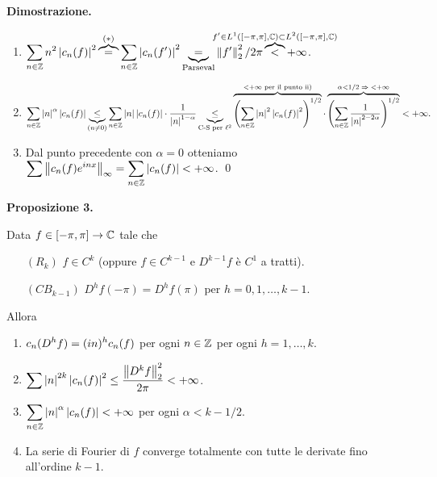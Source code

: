 \textbf{Dimostrazione.}
\begin{enumerate}

	\item $\ds \sum_{n \in \Z} n^2 \left| c_n(f) \right|^2 \overbrace{=}^{(\ast)} \sum_{n \in \Z} \left| c_n(f') \right|^2
	\underbrace{=}_{\text{Parseval}} \norm{f'}_2^2 / 2\pi \overbrace{<}^{\mathclap{f' \in L^1([-\pi,\pi], \C) \subset L^2([-\pi,\pi], \C) }} +\infty$.

	\item $\displaystyle \sum_{n \in \mathbb Z} \left| n \right|^\alpha \left| c_n(f) \right| 
	\underbrace{\leq}_{(n \neq 0)} \sum_{n \in \mathbb Z} \left| n \right| \left| c_n(f) \right| \cdot \frac{1}{\left| n \right|^{1-\alpha }}
	\underbrace{\leq}_{\text{C-S per } \ell^2} \overbrace{\left( \sum_{n \in \mathbb Z} \left| n \right|^2 \left| c_n(f) \right|^2  \right)^{1/2}}^{< +\infty \text{ per il punto ii)}} \cdot \overbrace{\left( \sum_{n \in \mathbb Z} \frac{1}{\left| n \right|^{2-2\alpha }}  \right)^{1/2}}^{\alpha < 1/2 \; \Rightarrow \; <+\infty} < +\infty. 
	$

	\item Dal punto precedente con $\alpha = 0$ otteniamo $\displaystyle \sum \left\lVert c_n(f) e^{inx} \right\rVert_\infty = \sum_{n \in \mathbb Z} \left| c_n(f) \right| < +\infty $.
\qed
\end{enumerate}

\newpage

\hypertarget{prop:2021-08nov_prop_3}{%
\textbf{Proposizione 3.}} Data $f \in [-\pi,\pi] \to \mathbb C$ tale che
\begin{itemize}
	\item[$(R_k)$] $f \in C^k$ (oppure $f \in C^{k-1}$ e $D^{k-1}f$ è $C^1$ a tratti).

	\item[$(CB_{k-1})$] $D^h f(-\pi) = D^h f(\pi)$ per $h = 0,1,\ldots, k-1$.
\end{itemize}
Allora
\begin{enumerate}
	\item $\displaystyle c_n (D^h f) = (in)^h c_n(f)$ per ogni $n \in \mathbb Z$ per ogni $h = 1,\ldots,k$.

	\item $\displaystyle \sum \left| n \right|^{2k} \left| c_n(f) \right|^2 \leq \frac{\left\lVert D^k f \right\rVert_2^2}{2\pi} < +\infty$.

	\item $\displaystyle \sum_{n \in \mathbb Z} \left| n \right|^\alpha \left| c_n(f) \right| < +\infty $ per ogni $\alpha < k - 1/2$.

	\item La serie di Fourier di $f$ converge totalmente con tutte le derivate fino all'ordine $k-1$.
\end{enumerate}

